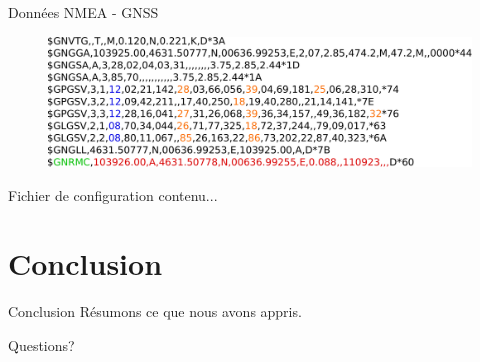 \documentclass{beamer}
\begin{document}
\begin{frame}{Données NMEA - GNSS}	
	\begin{figure}[h]
		\centering
		\includegraphics[width=0.9\linewidth]{../figures/presentation/donnees-NMEA}
	\end{figure}
	\begin{figure}[h]
		\centering
	\end{figure}
\end{frame}

\begin{frame}{Fichier de configuration}
	contenu...
\end{frame}

\section{Conclusion}
\begin{frame}{Conclusion}
	Résumons ce que nous avons appris.
\end{frame}

\begin{frame}[standout]
	Questions?
\end{frame}
	
\end{document}
